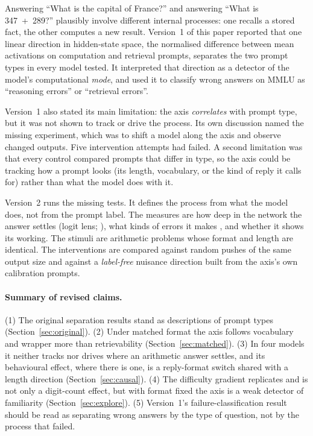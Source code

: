 \documentclass[11pt]{article}
\begin{document}
Answering ``What is the capital of France?'' and answering ``What is 347~+~289?'' plausibly involve different internal processes: one recalls a stored fact, the other computes a new result. Version~1 of this paper \citep{ramdan2026crv1} reported that one linear direction in hidden-state space, the normalised difference between mean activations on computation and retrieval prompts, separates the two prompt types in every model tested. It interpreted that direction as a detector of the model's computational \emph{mode}, and used it to classify wrong answers on MMLU as ``reasoning errors'' or ``retrieval errors''.

Version~1 also stated its main limitation: the axis \emph{correlates} with prompt type, but it was not shown to track or drive the process. Its own discussion named the missing experiment, which was to shift a model along the axis and observe changed outputs. Five intervention attempts had failed. A second limitation was that every control compared prompts that differ in type, so the axis could be tracking how a prompt looks (its length, vocabulary, or the kind of reply it calls for) rather than what the model does with it.

Version~2 runs the missing tests. It defines the process from what the model does, not from the prompt label. The measures are how deep in the network the answer settles (logit lens; \citealp{nostalgebraist2020logitlens}), what kinds of errors it makes \citep{campbell1985mental}, and whether it shows its working. The stimuli are arithmetic problems whose format and length are identical. The interventions are compared against random pushes of the same output size and against a \emph{label-free} nuisance direction built from the axis's own calibration prompts.

\paragraph{Summary of revised claims.}
(1) The original separation results stand as descriptions of prompt types (Section~\ref{sec:original}).
(2) Under matched format the axis follows vocabulary and wrapper more than retrievability (Section~\ref{sec:matched}).
(3) In four models it neither tracks nor drives where an arithmetic answer settles, and its behavioural effect, where there is one, is a reply-format switch shared with a length direction (Section~\ref{sec:causal}).
(4) The difficulty gradient replicates and is not only a digit-count effect, but with format fixed the axis is a weak detector of familiarity (Section~\ref{sec:explore}).
(5) Version~1's failure-classification result should be read as separating wrong answers by the type of question, not by the process that failed.
\end{document}
